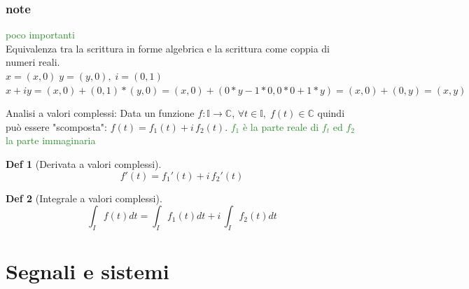 \documentclass[a4paper]{article}
\newtheorem*{definition}{Def}
\newcommand{\appunto}[1]{\textcolor{ForestGreen}{#1}}
\newcommand{\C}[0]{\mathbb{C}}
\begin{document}
\subsubsection{note} 
\appunto{poco importanti}\\
Equivalenza tra la scrittura in forme algebrica e la scrittura come coppia di numeri reali.\\
$x = (x,0)\; y=(y,0),\; i=(0,1)$\\ 
$x+iy = (x,0) + (0,1)*(y,0) = (x,0) + (0*y - 1*0, 0*0 + 1*y ) = (x,0) + (0,y) = (x,y)$

Analisi a valori complessi:
Data un funzione $f: \mathbb{I} \rightarrow \C$,  $\forall t\in \mathbb{I},\; f(t)\in \C$
quindi può essere "scomposta": $f(t) = f_1(t) + i\,f_2(t)$.
\appunto{$f_1$ è la parte reale di $f_t$ ed $f_2$ la parte immaginaria}
\begin{definition}[Derivata a valori complessi]
	$$f'(t) = f_1'(t) + i\, f_2'(t)$$
\end{definition}
\begin{definition}[Integrale a valori complessi]
	$$\int_If(t) dt = \int_If_1(t) dt + i\, \int_If_2(t) dt$$
\end{definition}

\section{Segnali e sistemi}
\end{document}
